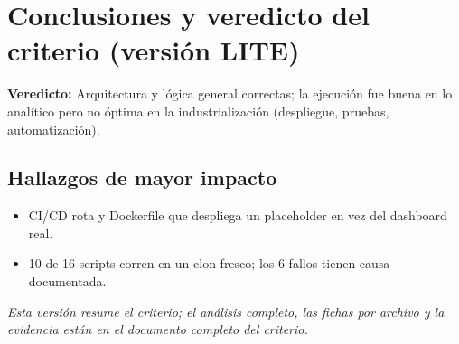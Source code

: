 \section{Conclusiones y veredicto del criterio (versión LITE)}

\begin{tcolorbox}[hallazgo]
\textbf{Veredicto:} Arquitectura y lógica general correctas; la ejecución fue buena en lo analítico pero no óptima en la industrialización (despliegue, pruebas, automatización).

\end{tcolorbox}

\subsection{Hallazgos de mayor impacto}

\begin{itemize}
  \item CI/CD rota y Dockerfile que despliega un placeholder en vez del dashboard real.
  \item 10 de 16 scripts corren en un clon fresco; los 6 fallos tienen causa documentada.
\end{itemize}

\noindent\textit{Esta versión resume el criterio; el análisis completo, las
fichas por archivo y la evidencia están en el documento completo del criterio.}
